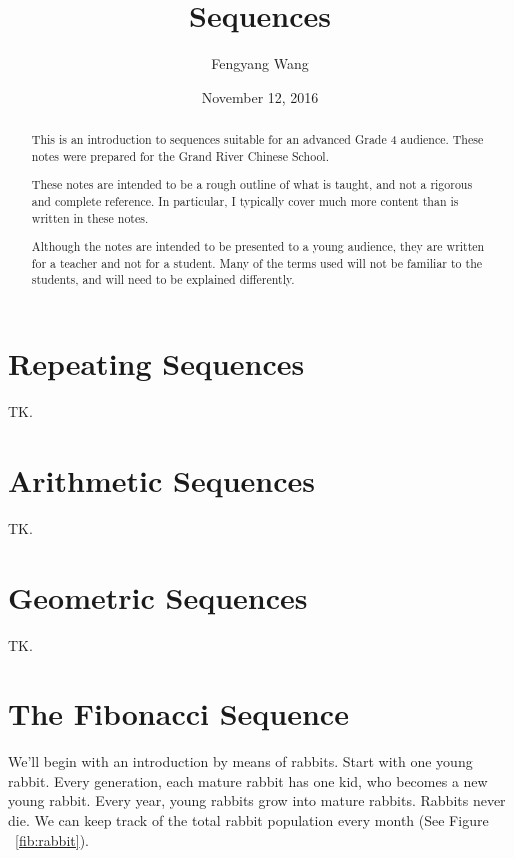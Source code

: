 \documentclass[a4paper,10pt]{report}
\title{Sequences}
\author{Fengyang Wang}
\date{November 12, 2016}
\begin{document}
\begin{abstract}

This is an introduction to sequences suitable for an advanced Grade 4 audience.
These notes were prepared for the Grand River Chinese School.

These notes are intended to be a rough outline of what is taught, and not a
rigorous and complete reference. In particular, I typically cover much more
content than is written in these notes.

Although the notes are intended to be presented to a young audience, they are
written for a teacher and not for a student. Many of the terms used will not be
familiar to the students, and will need to be explained differently.

\end{abstract}

\maketitle

\tableofcontents

\chapter{Repeating Sequences}

TK.

\chapter{Arithmetic Sequences}

TK.

\chapter{Geometric Sequences}

TK.

\chapter{The Fibonacci Sequence}

We'll begin with an introduction by means of rabbits. Start with one young
rabbit. Every generation, each mature rabbit has one kid, who becomes a new
young rabbit. Every year, young rabbits grow into mature rabbits. Rabbits never
die. We can keep track of the total rabbit population every month (See Figure
~\ref{fib:rabbit}).
\end{document}
